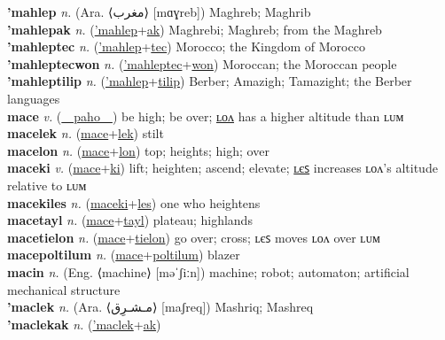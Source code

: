 \textbf{'mahlep} \textit{n.} (Ara. ⟨مغرب‎⟩ [mɑɣreb])
Maghreb; Maghrib \label{'mahlep} \\
\textbf{'mahlepak} \textit{n.} (\hyperref['mahlep]{'mahlep}+\hyperref[ak]{ak})
Maghrebi; Maghreb; from the Maghreb \label{'mahlepak} \\
\textbf{'mahleptec} \textit{n.} (\hyperref['mahlep]{'mahlep}+\hyperref[tec]{tec})
Morocco; the Kingdom of Morocco \label{'mahleptec} \\
\textbf{'mahleptecwon} \textit{n.} (\hyperref['mahleptec]{'mahleptec}+\hyperref[won]{won})
Moroccan; the Moroccan people \label{'mahleptecwon} \\
\textbf{'mahleptilip} \textit{n.} (\hyperref['mahlep]{'mahlep}+\hyperref[tilip]{tilip})
Berber; Amazigh; Tamazight; the Berber languages \label{'mahleptilip} \\
\textbf{mace} \textit{v.} (\hyperref[paho]{~~paho~~})
be high; be over; \hyperref[macelon]{ʟᴏᴧ} has a higher altitude than ʟᴜᴍ \label{mace} \\
\textbf{macelek} \textit{n.} (\hyperref[mace]{mace}+\hyperref[lek]{lek})
stilt \label{macelek} \\
\textbf{macelon} \textit{n.} (\hyperref[mace]{mace}+\hyperref[lon]{lon})
top; heights; high; over \label{macelon} \\
\textbf{maceki} \textit{v.} (\hyperref[mace]{mace}+\hyperref[ki]{ki})
lift; heighten; ascend; elevate; \hyperref[macekiles]{ʟєꜱ} increases ʟᴏᴧ’s altitude relative to ʟᴜᴍ \label{maceki} \\
\textbf{macekiles} \textit{n.} (\hyperref[maceki]{maceki}+\hyperref[les]{les})
one who heightens \label{macekiles} \\
\textbf{macetayl} \textit{n.} (\hyperref[mace]{mace}+\hyperref[tayl]{tayl})
plateau; highlands \label{macetayl} \\
\textbf{macetielon} \textit{n.} (\hyperref[mace]{mace}+\hyperref[tielon]{tielon})
go over; cross; ʟєꜱ moves ʟᴏᴧ over ʟᴜᴍ \label{macetielon} \\
\textbf{macepoltilum} \textit{n.} (\hyperref[mace]{mace}+\hyperref[poltilum]{poltilum})
blazer \label{macepoltilum} \\
\textbf{macin} \textit{n.} (Eng. ⟨machine⟩ [məˈʃiːn])
machine; robot; automaton; artificial mechanical structure \label{macin} \\
\textbf{'maclek} \textit{n.} (Ara. ⟨مـشـرِق‎‎⟩ [maʃreq])
Mashriq; Mashreq \label{'maclek} \\
\textbf{'maclekak} \textit{n.} (\hyperref['maclek]{'maclek}+\hyperref[ak]{ak})
